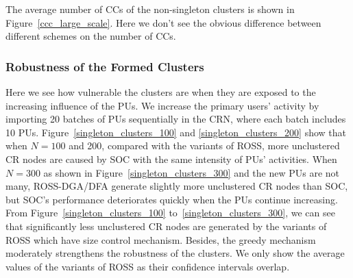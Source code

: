 \documentclass[times]{ettauth}
\theoremstyle{mytheoremstyle}
\theoremstyle{mytheoremstyle}
\theoremstyle{mytheoremstyle}
\begin{document}
The average number of CCs of the non-singleton clusters is shown in Figure~\ref{ccc_large_scale}.
Here we don't see the obvious difference between different schemes on the number of CCs.




\subsubsection{Robustness of the Formed Clusters}
Here we see how vulnerable the clusters are when they are exposed to the increasing influence of the PUs.
We increase the primary users' activity by importing 20 batches of PUs sequentially in the CRN, where each batch includes 10 PUs. 
%
Figure~\ref{singleton_clusters_100} and \ref{singleton_clusters_200} show that when $N=100$ and 200, compared with the variants of ROSS, more unclustered CR nodes are caused by SOC with the same intensity of PUs' activities.
When $N=300$ as shown in Figure~\ref{singleton_clusters_300} and the new PUs are not many, ROSS-DGA/DFA generate slightly more unclustered CR nodes than SOC, but SOC's performance deteriorates quickly when the PUs continue increasing.
%
From Figure~\ref{singleton_clusters_100} to~\ref{singleton_clusters_300}, we can see that significantly less unclustered CR nodes are generated by the variants of ROSS which have size control mechanism.
Besides, the greedy mechanism moderately strengthens the robustness of the clusters.
We only show the average values of the variants of ROSS as their confidence intervals overlap.
\end{document}
